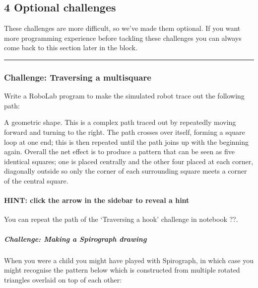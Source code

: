 \documentclass[letterpaper,10pt,english]{sphinxmanual}
\let\sphinxpxdimen\pdfpxdimen\else\newdimen\sphinxpxdimen
\begin{document}
{\subsection{4 Optional challenges}
\label{\detokenize{content/02_Robot_Lab/Section_00_04:4-Optional-challenges}}\label{\detokenize{content/02_Robot_Lab/Section_00_04::doc}}
These challenges are more difficult, so we’ve made them optional. If you want more programming experience before tackling these challenges you can always come back to this section later in the block.


\bigskip\hrule\bigskip



\subsubsection{Challenge: Traversing a multi\sphinxhyphen{}square}
\label{\detokenize{content/02_Robot_Lab/Section_00_04:Challenge:-Traversing-a-multi-square}}
Write a RoboLab program to make the simulated robot trace out the following path:

\sphinxincludegraphics[width=105\sphinxpxdimen,height=106\sphinxpxdimen]{{tm129_rob_p3_f023}.gif}

A geometric shape. This is a complex path traced out by repeatedly moving forward and turning to the right. The path crosses over itself, forming a square loop at one end; this is then repeated until the path joins up with the beginning again. Overall the net effect is to produce a pattern that can be seen as five identical squares; one is placed centrally and the other four placed at each corner, diagonally outside so only the corner of each surrounding square meets a corner of the central
square.


\paragraph{HINT: click the arrow in the sidebar to reveal a hint}
\label{\detokenize{content/02_Robot_Lab/Section_00_04:HINT:-click-the-arrow-in-the-sidebar-to-reveal-a-hint}}
You can repeat the path of the ‘Traversing a hook’ challenge in notebook ??.


\subparagraph{Challenge: Making a Spirograph drawing}
\label{\detokenize{content/02_Robot_Lab/Section_00_04:Challenge:-Making-a-Spirograph-drawing}}
When you were a child you might have played with Spirograph, in which case you might recognise the pattern below which is constructed from multiple rotated triangles overlaid on top of each other: 

}
\end{document}
